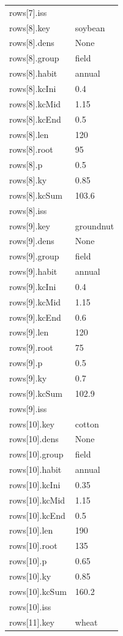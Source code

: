 {\begin{longtable}{p{}p{}}
{}rows[7].iss & \\
{}rows[8].key & soybean\\
{}rows[8].dens & None\\
{}rows[8].group & field\\
{}rows[8].habit & annual\\
{}rows[8].kcIni & 0.4\\
{}rows[8].kcMid & 1.15\\
{}rows[8].kcEnd & 0.5\\
{}rows[8].len & 120\\
{}rows[8].root & 95\\
{}rows[8].p & 0.5\\
{}rows[8].ky & 0.85\\
{}rows[8].kcSum & 103.6\\
{}rows[8].iss & \\
{}rows[9].key & groundnut\\
{}rows[9].dens & None\\
{}rows[9].group & field\\
{}rows[9].habit & annual\\
{}rows[9].kcIni & 0.4\\
{}rows[9].kcMid & 1.15\\
{}rows[9].kcEnd & 0.6\\
{}rows[9].len & 120\\
{}rows[9].root & 75\\
{}rows[9].p & 0.5\\
{}rows[9].ky & 0.7\\
{}rows[9].kcSum & 102.9\\
{}rows[9].iss & \\
{}rows[10].key & cotton\\
{}rows[10].dens & None\\
{}rows[10].group & field\\
{}rows[10].habit & annual\\
{}rows[10].kcIni & 0.35\\
{}rows[10].kcMid & 1.15\\
{}rows[10].kcEnd & 0.5\\
{}rows[10].len & 190\\
{}rows[10].root & 135\\
{}rows[10].p & 0.65\\
{}rows[10].ky & 0.85\\
{}rows[10].kcSum & 160.2\\
{}rows[10].iss & \\
{}rows[11].key & wheat\\

\end{longtable}}
